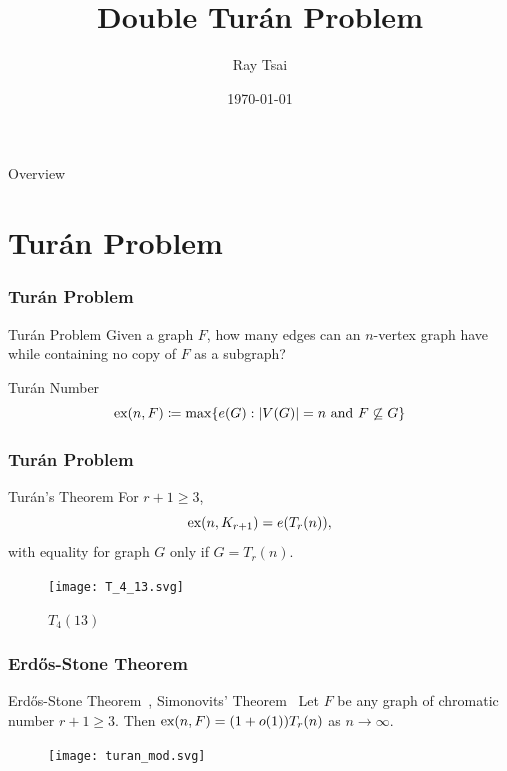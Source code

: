 \documentclass{beamer}
\title{Double Turán Problem}
\author{Ray Tsai}
\date{\today}
\newcommand*{\ex}{\textnormal{ex}}
\begin{document}
\frame{\titlepage}

\begin{frame}{Overview}
  \tableofcontents
\end{frame}

\section{Turán Problem}

\begin{frame}
\frametitle{Turán Problem}

\begin{block}{Turán Problem}
  Given a graph $F$, how many edges can an $n$-vertex graph have while containing no copy of $F$ as a subgraph?
\end{block}

\pause

\vspace{0.5cm}

\begin{block}{Turán Number}
  \[
    \ex(n, F) \coloneq \max \{ e(G) : |V(G)| = n \text{ and } F \not\subseteq G \}
  \]
\end{block}
\end{frame}

\begin{frame}
  \frametitle{Turán Problem}

  \begin{block}{Turán's Theorem \cite{Turan1941}}
    For $r + 1 \geq 3$,
    \[
      \ex(n, K_{r + 1}) = e(T_{r}(n)),
    \]
    with equality for graph $G$ only if $G = T_{r}(n)$.
  \end{block}

  \begin{figure}
    \centering
    \texttt{[image: T\_4\_13.svg]}
    \caption{$T_4(13)$}
  \end{figure}
\end{frame}

\begin{frame}
  \frametitle{Erd\H{o}s-Stone Theorem}

  \begin{block}{Erd\H{o}s-Stone Theorem~\cite{ErdosStone1946}, Simonovits' Theorem~\cite{ErdosSimonovits1966}}
    Let $F$ be any graph of chromatic number $r + 1 \geq 3$. Then $\ex(n, F) = (1 + o(1))T_r(n)$ as $n \rightarrow \infty$.
  \end{block}

  \begin{figure}
    \centering
    \texttt{[image: turan\_mod.svg]}
  \end{figure}
\end{frame}
\end{document}
